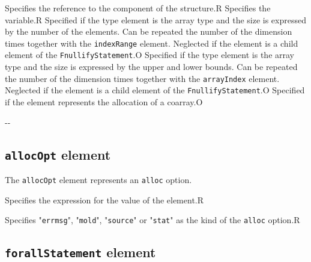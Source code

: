 \begin{XcodeMLChildElements}
{Specifies the reference to the component of the structure.}{R}
{Specifies the variable.}{R}
{Specified if the type element is the array type and the size is expressed by the number of
 the elements. Can be repeated the number of the dimension times together with the {\tt indexRange} element.
 Neglected if the element is a child element of the {\tt FnullifyStatement}.}{O}
{Specified if the type element is the array type and the size is expressed by the upper and lower bounds.
 Can be repeated the number of the dimension times together with the {\tt arrayIndex} element.
 Neglected if the element is a child element of the {\tt FnullifyStatement}.}{O}
{Specified if the element represents the allocation of a coarray.}{O}
\end{XcodeMLChildElements}

\begin{XcodeMLAttributes}
\XcodeMLAttrDef{-}{-}
{-}{-}
\end{XcodeMLAttributes}


\subsection{ {\tt allocOpt} element}

The {\tt allocOpt} element represents an {\tt alloc} option.


\begin{XcodeMLChildElements}
{Specifies the expression for the value of the element.}{R}
\end{XcodeMLChildElements}

\begin{XcodeMLAttributes}
{Specifies "{\tt errmsg}", "{\tt mold}", "{\tt source}" or "{\tt stat}" as the kind of the {\tt alloc} option.}{R}
\end{XcodeMLAttributes}


\subsection{ {\tt forallStatement} element}

